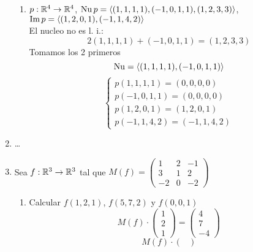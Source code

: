 \documentclass[../practica.root.tex]{subfiles}
\begin{document}
\begin{enumerate}
\begin{enumerate}
              \item $ p : \mathbb{R}^4 \to \mathbb{R}^4 $, $ \operatorname{Nu} p = \langle (1,1,1,1),(-1,0,1,1),(1,2,3,3) \rangle $, $ \operatorname{Im} p = \langle (1,2,0,1),(-1,1,4,2) \rangle $ \\
                    El nucleo no es l. i.:
                    \[ 2(1,1,1,1) + (-1,0,1,1) = (1,2,3,3) \]
                    Tomamos los 2 primeros
                    \[ \operatorname{Nu} = \langle (1,1,1,1),(-1,0,1,1) \rangle \]
                    \[
                        \boxed{
                            \begin{cases}
                                p(1,1,1,1) = (0,0,0,0)  \\
                                p(-1,0,1,1) = (0,0,0,0) \\
                                p(1,2,0,1) = (1,2,0,1)  \\
                                p(-1,1,4,2) = (-1,1,4,2)
                            \end{cases}
                        }
                    \]
          \end{enumerate}
    \item \dots
    \item Sea $ f : \mathbb{R}^3 \to \mathbb{R}^3 $ tal que $ M(f) = \begin{pmatrix}
              1  & 2 & -1 \\
              3  & 1 & 2  \\
              -2 & 0 & -2
          \end{pmatrix} $
          \begin{enumerate}
              \item Calcular $ f(1,2,1) $, $ f(5,7,2) $ y $ f(0,0,1) $
                    \[
                        M(f)\cdot
                        \begin{pmatrix}
                            1 \\ 2 \\ 1
                        \end{pmatrix}
                        =
                        \boxed{
                            \begin{pmatrix}
                                4 \\ 7 \\ -4
                            \end{pmatrix}
                        }
                    \] \[
                        M(f)\cdot
                        \begin{pmatrix}

\end{pmatrix}\]
\end{enumerate}
\end{enumerate}
\end{document}
